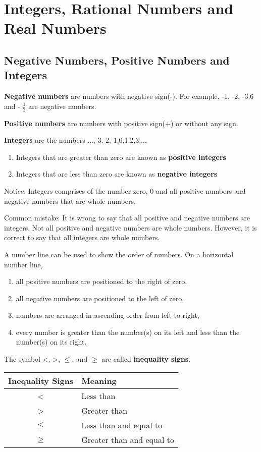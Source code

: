 \documentclass[../main]{subfiles}
\begin{document}
\section{Integers, Rational Numbers and Real Numbers}

\subsection{Negative Numbers, Positive Numbers and Integers}
\textbf{Negative numbers} are numbers with negative sign(-). For example, -1,
-2, -3.6 and - \(\frac 1 2 \) are negative numbers.

\textbf{Positive numbers} are numbers with positive sign(+) or without any sign.

\textbf{Integers} are the numbers ...,-3,-2,-1,0,1,2,3,...
\begin{enumerate}
  \item Integers that are greater than zero are known as \textbf{positive
    integers}
  \item Integers that are less than zero are known as \textbf{negative integers}
\end{enumerate}
Notice: Integers comprises of the number zero, 0 and all positive numbers and
negative numbers that are whole numbers.

Common mistake:
It is wrong to say that all positive and negative numbers are integers. Not all
positive and negative numbers are whole numbers. However, it is correct to say
that all integers are whole numbers.

A number line can be used to show the order of numbers. On a horizontal number
line,
\begin{enumerate}
\item all positive numbers are positioned to the right of zero.
\item all negative numbers are positioned to the left of zero,
\item numbers are arranged in ascending order from left to right,
  \item every number is greater than the number(s) on its left and less than the
    number(s) on its right.
    
\end{enumerate}

The symbol \textless , \textgreater ,  \(\leq\), and \(\geq\) are called \textbf{inequality signs}.
\begin{center}
\begin{tabular}{| c| l |  }
  \hline
 Inequality Signs & Meaning \\ 
  \hline
  \textless & Less than \\  
  \hline
 \textgreater  & Greater than \\   
  \hline

 \(\leq \) & Less than and equal to \\   
  \hline
 \(\geq \) & Greater than and equal to \\   
  \hline
\end{tabular}
\end{center}
\end{document}
